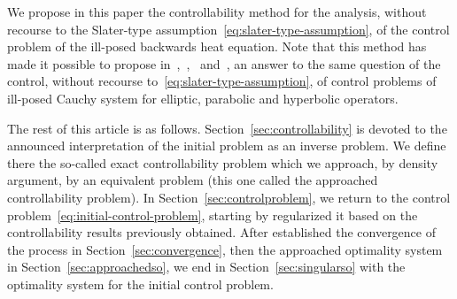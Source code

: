 We propose in this paper the controllability method for the analysis,
without recourse to the Slater-type
assumption~\eqref{eq:slater-type-assumption}, of the control problem of the
ill-posed backwards heat equation. Note that this method has made it
possible to propose
in~\cite{ownElliptic},~\cite{ownAAA},~\cite{ownParabolic}
and~\cite{ownhyperbolic}, an answer to the same question of the control,
without recourse to~\eqref{eq:slater-type-assumption}, of control problems
of ill-posed Cauchy system for elliptic, parabolic and hyperbolic
operators.

The rest of this article is as follows. Section~\ref{sec:controllability}
is devoted to the announced interpretation of the initial problem as an
inverse problem. We define there the so-called exact controllability
problem which we approach, by density argument, by an equivalent problem
(this one called the approached controllability problem). In
Section~\ref{sec:controlproblem}, we return to the control
problem~\eqref{eq:initial-control-problem}, starting by regularized it
based on the controllability results previously obtained. After established
the convergence of the process in Section~\ref{sec:convergence}, then the
approached optimality system in Section~\ref{sec:approachedso}, we end in
Section~\ref{sec:singularso} with the optimality system for the initial
control problem.

